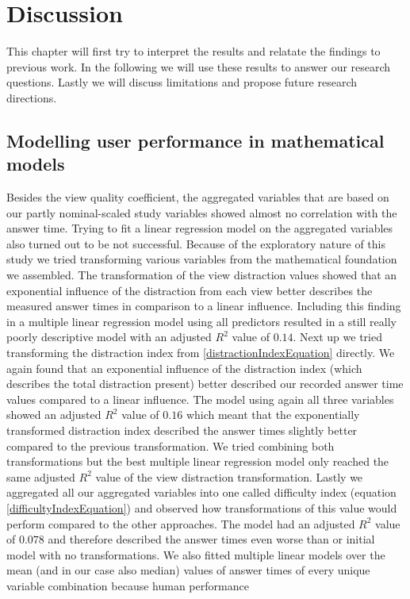\chapter{Discussion}
This chapter will first try to interpret the results and relatate the findings to previous work. In the following we will use these results to answer
our research questions. Lastly we will discuss limitations and propose future research directions.
\section{Modelling user performance in mathematical models}
Besides the view quality coefficient, the aggregated variables that are based on our partly nominal-scaled study variables showed almost no correlation with
the answer time. Trying to fit a linear regression model on the aggregated variables also turned out to be not successful. Because of the exploratory nature
of this study we tried transforming various variables
from the mathematical foundation we assembled. The transformation of the view distraction values showed that an exponential influence of the distraction from each view
better describes the measured answer times in comparison to a linear influence. Including this finding in a multiple linear regression model using all predictors
resulted in a still really poorly descriptive model with an adjusted $R^2$ value of $0.14$. Next up we tried transforming the distraction index from \ref{distractionIndexEquation}
directly. We again found that an exponential influence of the distraction index (which describes the total distraction present) better described our recorded
answer time values compared to a linear influence. The model using again all three variables showed an adjusted $R^2$ value of $0.16$ which meant that the exponentially
transformed distraction index described the answer times slightly better compared to the previous transformation. We tried combining both transformations but the best
multiple linear regression model only reached the same adjusted $R^2$ value of the view distraction transformation. Lastly we aggregated all our aggregated variables
into one called difficulty index (equation \ref{difficultyIndexEquation}) and observed how transformations of this value would perform compared to the other approaches.
The model had an adjusted $R^2$ value of $0.078$ and therefore described the answer times even worse than or initial model with no transformations.
We also fitted multiple linear models over the mean (and in our case also median) values of answer times of every unique variable combination because human performance
